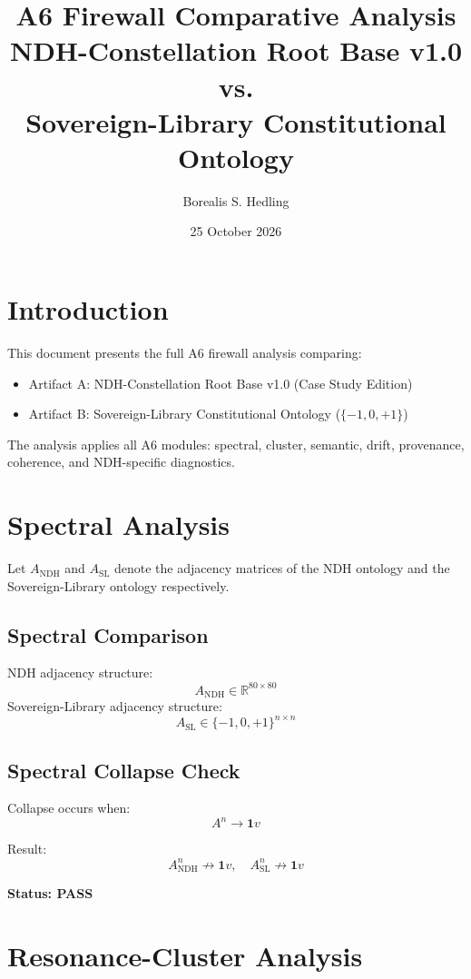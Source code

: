 \documentclass[12pt]{article}
\title{A6 Firewall Comparative Analysis \\
NDH-Constellation Root Base v1.0 \\
vs. \\
Sovereign-Library Constitutional Ontology}
\author{Borealis S. Hedling}
\date{25 October 2026}
\begin{document}
\maketitle

\section{Introduction}

This document presents the full A6 firewall analysis comparing:

\begin{itemize}
  \item Artifact A: NDH-Constellation Root Base v1.0 (Case Study Edition)
  \item Artifact B: Sovereign-Library Constitutional Ontology ($\{-1,0,+1\}$)
\end{itemize}

The analysis applies all A6 modules: spectral, cluster, semantic, drift,
provenance, coherence, and NDH-specific diagnostics.

\section{Spectral Analysis}

Let $A_{\mathrm{NDH}}$ and $A_{\mathrm{SL}}$ denote the adjacency matrices of
the NDH ontology and the Sovereign-Library ontology respectively.

\subsection{Spectral Comparison}

NDH adjacency structure:
\[
A_{\mathrm{NDH}} \in \mathbb{R}^{80 \times 80}
\]
Sovereign-Library adjacency structure:
\[
A_{\mathrm{SL}} \in \{-1,0,+1\}^{n \times n}
\]

\subsection{Spectral Collapse Check}

Collapse occurs when:
\[
A^n \to \mathbf{1} v
\]

Result:
\[
A_{\mathrm{NDH}}^n \not\to \mathbf{1} v, \quad
A_{\mathrm{SL}}^n \not\to \mathbf{1} v
\]

\textbf{Status: PASS}

\section{Resonance-Cluster Analysis}
\end{document}
